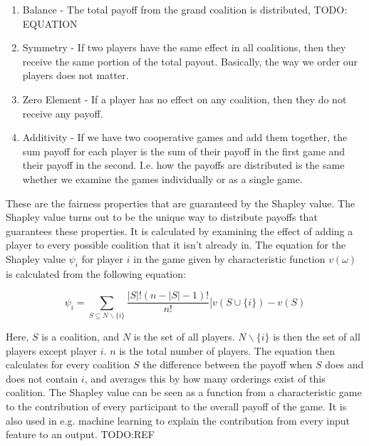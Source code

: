 \begin{enumerate}

  \item Balance - The total payoff from the grand coalition is distributed,
    TODO: EQUATION

  \item Symmetry - If two players have the same effect in all coalitions, then
    they receive the same portion of the total payout. Basically, the way we
    order our players does not matter.

  \item Zero Element - If a player has no effect on any coalition, then they do
    not receive any payoff.

  \item Additivity - If we have two cooperative games and add them together,
    the sum payoff for each player is the sum of their payoff in the first game
    and their payoff in the second. I.e. how the payoffs are distributed is the
    same whether we examine the games individually or as a single game.

\end{enumerate}

These are the fairness properties that are guaranteed by the Shapley value. The
Shapley value turns out to be the unique way to distribute payoffs that
guarantees these properties. It is calculated by examining the effect of adding
a player to every possible coalition that it isn't already in. The equation for
the Shapley value $\psi_i$ for player $i$ in the game given by characteristic
function $v(\omega)$ is calculated from the following equation:

\begin{equation}
  \psi_i = \sum_{S \subseteq N \backslash \{i\}} \frac{|S|!(n-|S|-1)!}{n!} [v(S \cup \{i\}) - v(S)
\end{equation}

Here, $S$ is a coalition, and $N$ is the set of all players. $N \backslash
\{i\}$ is then the set of all players except player $i$. $n$ is the total
number of players. The equation then calculates for every coalition $S$ the
difference between the payoff when $S$ does and does not contain $i$, and
averages this by how many orderings exist of this coalition. The Shapley value
can be seen as a function from a characteristic game to the contribution of
every participant to the overall payoff of the game. It is also used in e.g.
machine learning to explain the contribution from every input feature to an
output. TODO:REF

